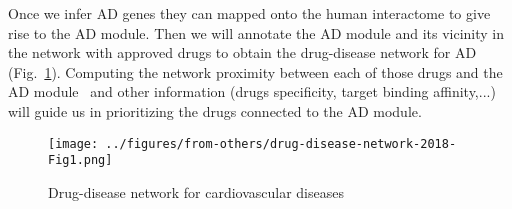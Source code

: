 \documentclass[letterpaper]{article}
\begin{document}
Once we infer AD genes they can mapped onto the human interactome to give rise
to the AD module.  Then we will annotate the AD module and its vicinity in the
network with approved drugs to obtain the drug-disease network for AD
(Fig.~\ref{ref:drug-disease-net}).  Computing the network proximity between
each of those drugs and the AD module~\citep{Cheng2018} and other information
(drugs specificity, target binding affinity,...) will guide us in prioritizing
the drugs connected to the AD module.

\begin{figure}
\begin{center}
\texttt{[image: ../figures/from-others/drug-disease-network-2018-Fig1.png]}
\end{center}
\caption{Drug-disease network for cardiovascular diseases}
\label{ref:drug-disease-net}
\end{figure}


\end{document}
